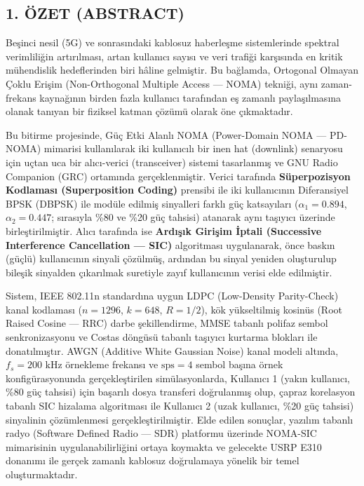 \documentclass[
]{IEEEtran}
\begin{document}
\subsection{1. ÖZET (ABSTRACT)}\label{uxf6zet-abstract}

Beşinci nesil (5G) ve sonrasındaki kablosuz haberleşme sistemlerinde
spektral verimliliğin artırılması, artan kullanıcı sayısı ve veri
trafiği karşısında en kritik mühendislik hedeflerinden biri hâline
gelmiştir. Bu bağlamda, Ortogonal Olmayan Çoklu Erişim (Non-Orthogonal
Multiple Access --- NOMA) tekniği, aynı zaman-frekans kaynağının birden
fazla kullanıcı tarafından eş zamanlı paylaşılmasına olanak tanıyan bir
fiziksel katman çözümü olarak öne çıkmaktadır.

Bu bitirme projesinde, Güç Etki Alanlı NOMA (Power-Domain NOMA ---
PD-NOMA) mimarisi kullanılarak iki kullanıcılı bir inen hat (downlink)
senaryosu için uçtan uca bir alıcı-verici (transceiver) sistemi
tasarlanmış ve GNU Radio Companion (GRC) ortamında gerçeklenmiştir.
Verici tarafında \textbf{Süperpozisyon Kodlaması (Superposition Coding)}
prensibi ile iki kullanıcının Diferansiyel BPSK (DBPSK) ile modüle
edilmiş sinyalleri farklı güç katsayıları (\(\alpha_1 = 0.894\),
\(\alpha_2 = 0.447\); sırasıyla \%80 ve \%20 güç tahsisi) atanarak aynı
taşıyıcı üzerinde birleştirilmiştir. Alıcı tarafında ise \textbf{Ardışık
Girişim İptali (Successive Interference Cancellation --- SIC)}
algoritması uygulanarak, önce baskın (güçlü) kullanıcının sinyali
çözülmüş, ardından bu sinyal yeniden oluşturulup bileşik sinyalden
çıkarılmak suretiyle zayıf kullanıcının verisi elde edilmiştir.

Sistem, IEEE 802.11n standardına uygun LDPC (Low-Density Parity-Check)
kanal kodlaması (\(n = 1296\), \(k = 648\), \(R = 1/2\)), kök
yükseltilmiş kosinüs (Root Raised Cosine --- RRC) darbe şekillendirme,
MMSE tabanlı polifaz sembol senkronizasyonu ve Costas döngüsü tabanlı
taşıyıcı kurtarma blokları ile donatılmıştır. AWGN (Additive White
Gaussian Noise) kanal modeli altında, \(f_s = 200 \text{ kHz}\)
örnekleme frekansı ve \(\text{sps} = 4\) sembol başına örnek
konfigürasyonunda gerçekleştirilen simülasyonlarda, Kullanıcı 1 (yakın
kullanıcı, \%80 güç tahsisi) için başarılı dosya transferi doğrulanmış
olup, çapraz korelasyon tabanlı SIC hizalama algoritması ile Kullanıcı 2
(uzak kullanıcı, \%20 güç tahsisi) sinyalinin çözümlenmesi
gerçekleştirilmiştir. Elde edilen sonuçlar, yazılım tabanlı radyo
(Software Defined Radio --- SDR) platformu üzerinde NOMA-SIC mimarisinin
uygulanabilirliğini ortaya koymakta ve gelecekte USRP E310 donanımı ile
gerçek zamanlı kablosuz doğrulamaya yönelik bir temel oluşturmaktadır.
\end{document}
